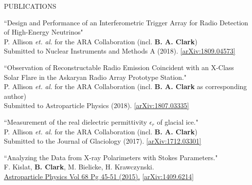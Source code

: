 \documentclass{resume} %
\begin{document}
\begin{rSection}{PUBLICATIONS}
\begin{etaremune}%
  \item ``Design and Performance of an Interferometric Trigger Array for Radio Detection of High-Energy Neutrinos" \\
 P. Allison {\it et. al.} for the ARA Collaboration (incl. \textbf{B. A. Clark}) \\
 Submitted to Nuclear Instruments and Methods A (2018). \href{https://arxiv.org/abs/1809.04573}{[arXiv:1809.04573]}
 \item ``Observation of Reconstructable Radio Emission Coincident with an X-Class Solar Flare in the Askaryan Radio Array Prototype Station." \\
 P. Allison {\it et. al.} for the ARA Collaboration (incl. \textbf{B. A. Clark} as corresponding author) \\
 Submitted to Astroparticle Physics (2018). \href{https://arxiv.org/abs/1807.03335}{[arXiv:1807.03335]}
  \item ``Measurement of the real dielectric permittivity $\epsilon_r$ of glacial ice." \\
 P. Allison {\it et. al.} for the ARA Collaboration (incl. \textbf{B. A. Clark}) \\
 Submitted to the Journal of Glaciology (2017). \href{https://arxiv.org/abs/1712.03301}{[arXiv:1712.03301]}
   \item ``Analyzing the Data from X-ray Polarimeters with Stokes Parameters." \\
 F. Kislat,  \textbf{B. Clark}, M. Bielicke, H. Krawczynski.  \\
  \href{http://dx.doi.org/10.1016/j.astropartphys.2015.02.007}{Astroparticle Physics Vol 68 Pg 45-51 (2015).} \href{https://arxiv.org/abs/1409.6214}{[arXiv:1409.6214]} 
 \end{etaremune}
\end{rSection}

\end{document}
